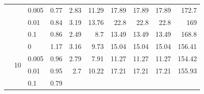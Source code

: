\begin{table}[htbp]
\begin{tabular}{|c|clrrrrrrr|}
      \\
     &
       &
      0.005 &
      \cellcolor[rgb]{ 1,  .937,  .612}0.77 &
      \cellcolor[rgb]{ .945,  .922,  .6}2.83 &
      \cellcolor[rgb]{ .71,  .847,  .553}11.29 &
      \cellcolor[rgb]{ .525,  .788,  .514}17.89 &
      \cellcolor[rgb]{ .525,  .788,  .514}17.89 &
      \cellcolor[rgb]{ .525,  .788,  .514}17.89 &
      \cellcolor[rgb]{ .608,  .761,  .902}172.7
      \\
     &
       &
      0.01 &
      \cellcolor[rgb]{ 1,  .937,  .612}0.84 &
      \cellcolor[rgb]{ .933,  .918,  .6}3.19 &
      \cellcolor[rgb]{ .643,  .827,  .537}13.76 &
      \cellcolor[rgb]{ .388,  .745,  .482}22.8 &
      \cellcolor[rgb]{ .388,  .745,  .482}22.8 &
      \cellcolor[rgb]{ .388,  .745,  .482}22.8 &
      \cellcolor[rgb]{ .98,  .988,  .996}169
      \\
     &
       &
      0.1 &
      \cellcolor[rgb]{ 1,  .937,  .612}0.86 &
      \cellcolor[rgb]{ .953,  .925,  .604}2.49 &
      \cellcolor[rgb]{ .78,  .871,  .569}8.7 &
      \cellcolor[rgb]{ .647,  .827,  .537}13.49 &
      \cellcolor[rgb]{ .647,  .827,  .537}13.49 &
      \cellcolor[rgb]{ .647,  .827,  .537}13.49 &
      168.8
      \\
\cmidrule{2-10}     &
      \multirow{4}[2]{*}{10} &
      0 &
      \cellcolor[rgb]{ .988,  .933,  .612}1.17 &
      \cellcolor[rgb]{ .914,  .91,  .596}3.16 &
      \cellcolor[rgb]{ .671,  .835,  .545}9.73 &
      \cellcolor[rgb]{ .471,  .773,  .502}15.04 &
      \cellcolor[rgb]{ .471,  .773,  .502}15.04 &
      \cellcolor[rgb]{ .471,  .773,  .502}15.04 &
      \cellcolor[rgb]{ .608,  .761,  .902}156.41
      \\
     &
       &
      0.005 &
      \cellcolor[rgb]{ .996,  .937,  .612}0.96 &
      \cellcolor[rgb]{ .925,  .918,  .596}2.79 &
      \cellcolor[rgb]{ .737,  .855,  .557}7.91 &
      \cellcolor[rgb]{ .612,  .816,  .529}11.27 &
      \cellcolor[rgb]{ .612,  .816,  .529}11.27 &
      \cellcolor[rgb]{ .612,  .816,  .529}11.27 &
      154.42
      \\
     &
       &
      0.01 &
      \cellcolor[rgb]{ .996,  .937,  .612}0.95 &
      \cellcolor[rgb]{ .929,  .918,  .6}2.7 &
      \cellcolor[rgb]{ .651,  .827,  .541}10.22 &
      \cellcolor[rgb]{ .388,  .745,  .482}17.21 &
      \cellcolor[rgb]{ .388,  .745,  .482}17.21 &
      \cellcolor[rgb]{ .388,  .745,  .482}17.21 &
      \cellcolor[rgb]{ .706,  .82,  .929}155.93
      \\
     &
       &
      0.1 &
      \cellcolor[rgb]{ 1,  .937,  .612}0.79 &

\end{tabular}
\end{table}
